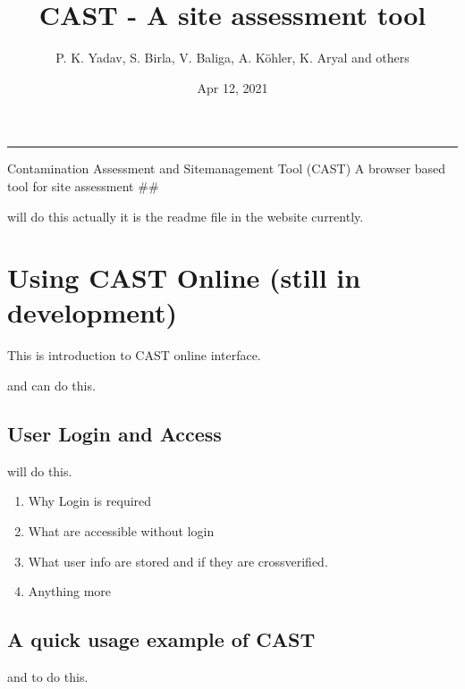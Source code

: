 \documentclass[letterpaper,10pt,english]{sphinxmanual}
\title{CAST - A site assessment tool}
\date{Apr 12, 2021}
\author{P.\@{} K.\@{} Yadav, S.\@{} Birla, V.\@{} Baliga, A.\@{} Köhler, K.\@{} Aryal and others}
\begin{document}
\pagestyle{empty}
\sphinxmaketitle
\pagestyle{plain}
\sphinxtableofcontents
\pagestyle{normal}
\label{\detokenize{intro::doc}}



\bigskip\hrule\bigskip


\sphinxAtStartPar
Contamination Assessment and Site\sphinxhyphen{}management Tool (CAST) \sphinxhyphen{} A browser based tool for site assessment \#\#

\sphinxAtStartPar
{} will do this \sphinxhyphen{} actually it is the readme file in the website currently.


\chapter{Using CAST Online (still in development)}
\label{\detokenize{contents/online/online_usage:using-cast-online-still-in-development}}\label{\detokenize{contents/online/online_usage::doc}}
\sphinxAtStartPar
This is introduction to CAST online interface.

\sphinxAtStartPar
{} and  can do this.


\section{User Login and Access}
\label{\detokenize{contents/online/login:user-login-and-access}}\label{\detokenize{contents/online/login::doc}}
\sphinxAtStartPar
{} will do this.
\begin{enumerate}
%
\item {} 
\sphinxAtStartPar
Why Login is required

\item {} 
\sphinxAtStartPar
What are accessible without login

\item {} 
\sphinxAtStartPar
What user info are stored and if they are cross\sphinxhyphen{}verified.

\item {} 
\sphinxAtStartPar
Anything more

\end{enumerate}


\section{A quick usage example of CAST}
\label{\detokenize{contents/online/quick_example:a-quick-usage-example-of-cast}}\label{\detokenize{contents/online/quick_example::doc}}
\sphinxAtStartPar
{} and  to do this.
\end{document}
